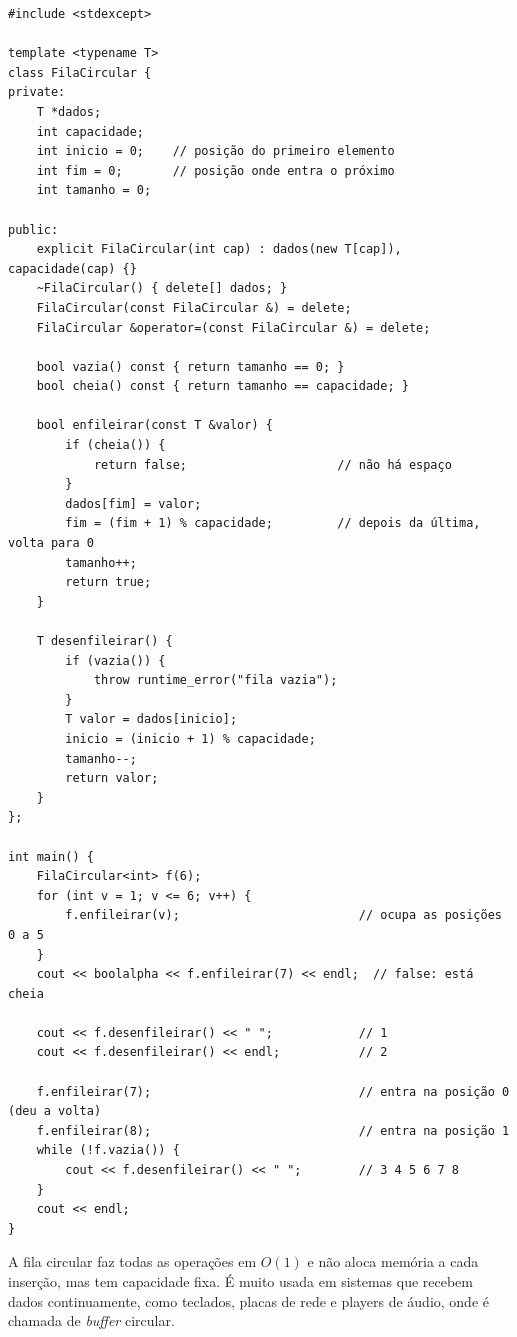 \begin{codigo}
\begin{Verbatim}[breaklines=true, breaksymbolleft={}, fontsize=\footnotesize]
#include <stdexcept>

template <typename T>
class FilaCircular {
private:
    T *dados;
    int capacidade;
    int inicio = 0;    // posição do primeiro elemento
    int fim = 0;       // posição onde entra o próximo
    int tamanho = 0;

public:
    explicit FilaCircular(int cap) : dados(new T[cap]), capacidade(cap) {}
    ~FilaCircular() { delete[] dados; }
    FilaCircular(const FilaCircular &) = delete;
    FilaCircular &operator=(const FilaCircular &) = delete;

    bool vazia() const { return tamanho == 0; }
    bool cheia() const { return tamanho == capacidade; }

    bool enfileirar(const T &valor) {
        if (cheia()) {
            return false;                     // não há espaço
        }
        dados[fim] = valor;
        fim = (fim + 1) % capacidade;         // depois da última, volta para 0
        tamanho++;
        return true;
    }

    T desenfileirar() {
        if (vazia()) {
            throw runtime_error("fila vazia");
        }
        T valor = dados[inicio];
        inicio = (inicio + 1) % capacidade;
        tamanho--;
        return valor;
    }
};

int main() {
    FilaCircular<int> f(6);
    for (int v = 1; v <= 6; v++) {
        f.enfileirar(v);                         // ocupa as posições 0 a 5
    }
    cout << boolalpha << f.enfileirar(7) << endl;  // false: está cheia

    cout << f.desenfileirar() << " ";            // 1
    cout << f.desenfileirar() << endl;           // 2

    f.enfileirar(7);                             // entra na posição 0 (deu a volta)
    f.enfileirar(8);                             // entra na posição 1
    while (!f.vazia()) {
        cout << f.desenfileirar() << " ";        // 3 4 5 6 7 8
    }
    cout << endl;
}
\end{Verbatim}
\end{codigo}

A fila circular faz todas as operações em $O(1)$ e não aloca memória a cada inserção, mas tem capacidade fixa. É muito usada em sistemas que recebem dados continuamente, como teclados, placas de rede e players de áudio, onde é chamada de \textit{buffer} circular.

